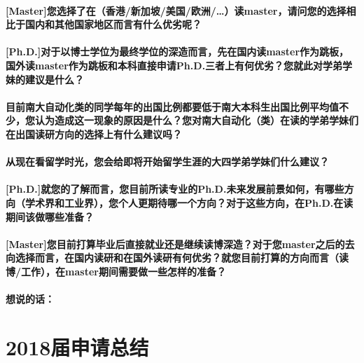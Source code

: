 \documentclass[a4paper,UTF8]{book}
\begin{document}
    \subsubsection*{[Master]您选择了在（香港/新加坡/美国/欧洲/…）读master，请问您的选择相比于国内和其他国家地区而言有什么优劣呢？}

    \subsubsection*{[Ph.D.]对于以博士学位为最终学位的深造而言，先在国内读master作为跳板，国外读master作为跳板和本科直接申请Ph.D.三者上有何优劣？您就此对学弟学妹的建议是什么？}

    \subsubsection*{目前南大自动化类的同学每年的出国比例都要低于南大本科生出国比例平均值不少，您认为造成这一现象的原因是什么？您对南大自动化（类）在读的学弟学妹们在出国读研方向的选择上有什么建议吗？}

    \subsubsection*{从现在看留学时光，您会给即将开始留学生涯的大四学弟学妹们什么建议？}

    \subsubsection*{[Ph.D.]就您的了解而言，您目前所读专业的Ph.D.未来发展前景如何，有哪些方向（学术界和工业界），您个人更期待哪一个方向？对于这些方向，在Ph.D.在读期间该做哪些准备？}

    \subsubsection*{[Master]您目前打算毕业后直接就业还是继续读博深造？对于您master之后的去向选择而言，在国内读研和在国外读研有何优劣？就您目前打算的方向而言（读博/工作），在master期间需要做一些怎样的准备？}
    
    \subsubsection{想说的话：}









\chapter{2018届申请总结}
\end{document}
